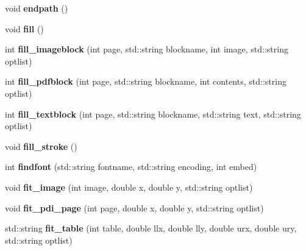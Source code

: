 \begin{DoxyCompactItemize}
\item 
\hypertarget{classPDFlib_a7d53283bf3787237ca080b1ee6897a26}{void {\bfseries endpath} ()}\label{classPDFlib_a7d53283bf3787237ca080b1ee6897a26}

\item 
\hypertarget{classPDFlib_a0a698c3eb4f96ec63cf9636074fd7870}{void {\bfseries fill} ()}\label{classPDFlib_a0a698c3eb4f96ec63cf9636074fd7870}

\item 
\hypertarget{classPDFlib_a584ee614b174cc35d99f0571227df21a}{int {\bfseries fill\-\_\-imageblock} (int page, std\-::string blockname, int image, std\-::string optlist)}\label{classPDFlib_a584ee614b174cc35d99f0571227df21a}

\item 
\hypertarget{classPDFlib_af9c0c51770f3296907a630314f04dd03}{int {\bfseries fill\-\_\-pdfblock} (int page, std\-::string blockname, int contents, std\-::string optlist)}\label{classPDFlib_af9c0c51770f3296907a630314f04dd03}

\item 
\hypertarget{classPDFlib_ad89aba96aa68737607b7c5f4f419bf33}{int {\bfseries fill\-\_\-textblock} (int page, std\-::string blockname, std\-::string text, std\-::string optlist)}\label{classPDFlib_ad89aba96aa68737607b7c5f4f419bf33}

\item 
\hypertarget{classPDFlib_af075d64fe8d704204883c548b7d48460}{void {\bfseries fill\-\_\-stroke} ()}\label{classPDFlib_af075d64fe8d704204883c548b7d48460}

\item 
\hypertarget{classPDFlib_a07e3c184619af04184b342136c97b30a}{int {\bfseries findfont} (std\-::string fontname, std\-::string encoding, int embed)}\label{classPDFlib_a07e3c184619af04184b342136c97b30a}

\item 
\hypertarget{classPDFlib_ae190bced58224501fce22ab778e7855b}{void {\bfseries fit\-\_\-image} (int image, double x, double y, std\-::string optlist)}\label{classPDFlib_ae190bced58224501fce22ab778e7855b}

\item 
\hypertarget{classPDFlib_aec960d2bb746ba340bcb0e275393aea4}{void {\bfseries fit\-\_\-pdi\-\_\-page} (int page, double x, double y, std\-::string optlist)}\label{classPDFlib_aec960d2bb746ba340bcb0e275393aea4}

\item 
\hypertarget{classPDFlib_a78221047371a56fe1680715e8f3ceceb}{std\-::string {\bfseries fit\-\_\-table} (int table, double llx, double lly, double urx, double ury, std\-::string optlist)}\label{classPDFlib_a78221047371a56fe1680715e8f3ceceb}


\end{DoxyCompactItemize}
